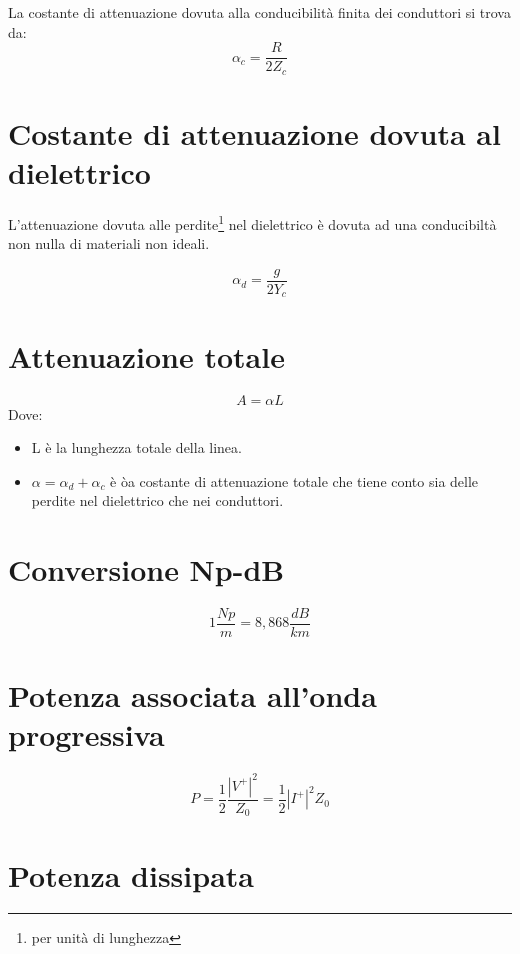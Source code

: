\documentclass[10pt,a4paper]{report}
\begin{document}
			La costante di attenuazione dovuta alla conducibilità finita dei conduttori si trova da:
			\begin{equation}
			\alpha_c=\frac{R}{2Z_c}
			\end{equation}
		
	\section{Costante di attenuazione dovuta al dielettrico}
	
			L'attenuazione dovuta alle perdite\footnote{per unità di lunghezza} nel dielettrico è dovuta ad una conducibiltà non nulla di materiali non ideali.

			\begin{equation}
			\alpha_d=\frac{g}{2Y_c}
			\end{equation}

	\section{Attenuazione totale}

			\begin{equation}
			A=\alpha L
			\end{equation}
			Dove:
			\begin{itemize}
			\item L è la lunghezza totale della linea.
			\item $\alpha=\alpha_d+\alpha_c$ è òa costante di attenuazione totale che tiene conto sia delle perdite nel dielettrico che nei conduttori.
			\end{itemize}

	\section{Conversione Np-dB}

	\[
	1\frac{Np}{m}=8,868\frac{dB}{km}
	\]
	
	\section{Potenza associata all'onda progressiva}

			\begin{equation}
			P=\frac{1}{2}\frac{|V^+|^2}{Z_0}=\frac{1}{2}|I^+|^2 Z_0
			\end{equation}

	\section{Potenza dissipata}
\end{document}

